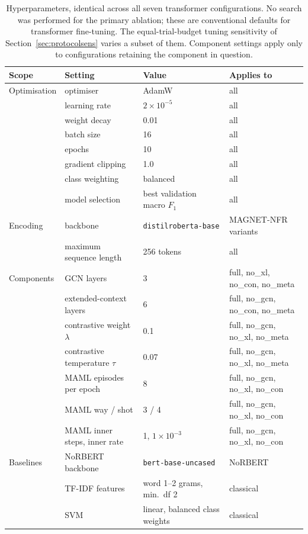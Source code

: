 \documentclass[11pt,a4paper]{article}
\begin{document}
\begin{table}[htbp]
\centering
\caption{Hyperparameters, identical across all seven transformer configurations. No search was performed for the primary ablation; these are conventional defaults for transformer
fine-tuning. The equal-trial-budget tuning sensitivity of Section~\ref{sec:protocolsens} varies a subset of
them. Component
settings apply only to configurations retaining the component in question.}
\label{tab:hyper}
\small
\begin{tabular}{@{}llll@{}}
\toprule
\textbf{Scope} & \textbf{Setting} & \textbf{Value} & \textbf{Applies to}\\
\midrule
Optimisation & optimiser & AdamW & all\\
 & learning rate & $2 \times 10^{-5}$ & all\\
 & weight decay & 0.01 & all\\
 & batch size & 16 & all\\
 & epochs & 10 & all\\
 & gradient clipping & 1.0 & all\\
 & class weighting & balanced & all\\
 & model selection & best validation macro $F_1$ & all\\
\addlinespace
Encoding & backbone & \texttt{distilroberta-base} & MAGNET-NFR variants\\
 & maximum sequence length & 256 tokens & all\\
\addlinespace
Components & GCN layers & 3 & full, no\_xl, no\_con, no\_meta\\
 & extended-context layers & 6 & full, no\_gcn, no\_con, no\_meta\\
 & contrastive weight $\lambda$ & 0.1 & full, no\_gcn, no\_xl, no\_meta\\
 & contrastive temperature $\tau$ & 0.07 & full, no\_gcn, no\_xl, no\_meta\\
 & MAML episodes per epoch & 8 & full, no\_gcn, no\_xl, no\_con\\
 & MAML way / shot & 3 / 4 & full, no\_gcn, no\_xl, no\_con\\
 & MAML inner steps, inner rate & 1, $1 \times 10^{-3}$ & full, no\_gcn, no\_xl, no\_con\\
\addlinespace
Baselines & NoRBERT backbone & \texttt{bert-base-uncased} & NoRBERT\\
 & TF-IDF features & word 1--2 grams, min.\ df 2 & classical\\
 & SVM & linear, balanced class weights & classical\\
\bottomrule
\end{tabular}
\end{table}
\end{document}
